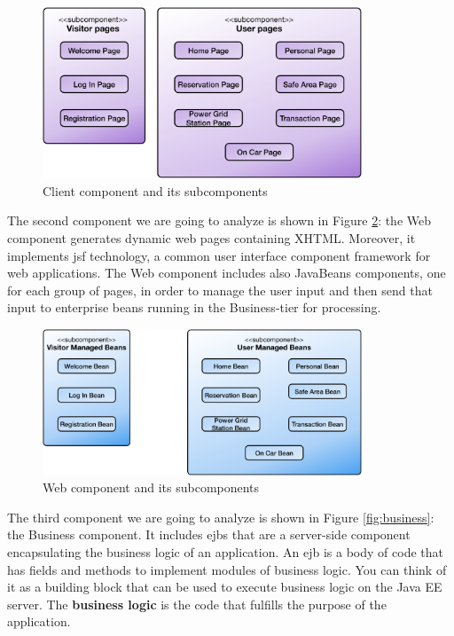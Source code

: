\vspace{52pt}
\begin{figure}[htbp]
\centering
\includegraphics[width=0.85\textwidth]{Images/ClientComponent.pdf}
\vspace{10pt}
\caption{Client component and its subcomponents}
\label{fig:client}
\end{figure}
\clearpage

\newline
The second component we are going to analyze is shown in Figure \ref{fig:web}: the Web component generates dynamic web pages containing XHTML. Moreover, it implements \acl{jsf} technology, a common user interface component framework for web applications.
The Web component includes also JavaBeans components, one for each group of pages, in order to manage the user input and then send that input to enterprise beans running in the Business-tier for processing.

\vspace{104pt}
\begin{figure}[htbp]
\centering
\includegraphics[width=0.85\textwidth]{Images/WebComponent.pdf}
\vspace{10pt}
\caption{Web component and its subcomponents}
\label{fig:web}
\end{figure}
\clearpage

\newline
The third component we are going to analyze is shown in Figure \ref{fig:business}: the Business component. It includes \acl{ejb}s that are a server-side component encapsulating the business logic of an application. An \acs{ejb} is a body of code that has fields and methods to implement modules of business logic. You can think of it as a building block that can be used to execute business logic on the Java EE server.
The \textbf{business logic} is the code that fulfills the purpose of the application.

